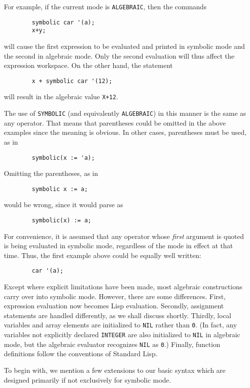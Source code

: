 For example, if the current mode is \texttt{ALGEBRAIC}, then the commands
\begin{verbatim}
        symbolic car '(a);
        x+y;
\end{verbatim}
will cause the first expression to be evaluated and printed in symbolic
mode and the second in algebraic mode. Only the second evaluation will
thus affect the expression workspace. On the other hand, the statement
\begin{verbatim}
        x + symbolic car '(12);
\end{verbatim}
will result in the algebraic value \texttt{X+12}.

The use of \texttt{SYMBOLIC} (and equivalently \texttt{ALGEBRAIC}) in this
manner is the same as any operator.  That means that parentheses could be
omitted in the above examples since the meaning is obvious.  In other
cases, parentheses must be used, as in

\begin{verbatim}
        symbolic(x := 'a);
\end{verbatim}
Omitting the parentheses, as in
\begin{verbatim}
        symbolic x := a;
\end{verbatim}
would be wrong, since it would parse as
\begin{verbatim}
        symbolic(x) := a;
\end{verbatim}
For convenience, it is assumed that any operator whose \emph{first} argument is
quoted is being evaluated in symbolic mode, regardless of the mode in
effect at that time. Thus, the first example above could be equally well
written:
\begin{verbatim}
        car '(a);
\end{verbatim}
Except where explicit limitations have been made, most {\REDUCE} algebraic
constructions carry over into symbolic mode.
However, there are some differences.  First, expression evaluation now
becomes Lisp evaluation.  Secondly, assignment statements are handled
differently, as we shall discuss shortly.  Thirdly, local variables and array
elements are initialized to \texttt{NIL} rather than \texttt{0}. (In fact, any
variables not explicitly declared \texttt{INTEGER} are also initialized to
\texttt{NIL} in algebraic mode, but the algebraic evaluator recognizes 
\texttt{NIL} as \texttt{0}.) Finally, function definitions follow the 
conventions of
Standard Lisp.

To begin with, we mention a few extensions to our basic syntax which are
designed primarily if not exclusively for symbolic mode.

